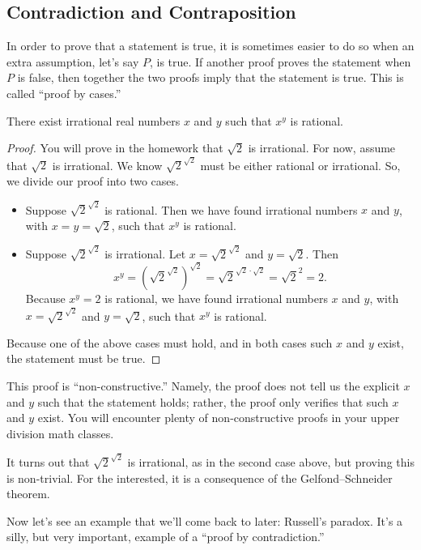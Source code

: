 \documentclass[../notes.tex]{subfiles}
\begin{document}
\subsection{Contradiction and Contraposition}
In order to prove that a statement is true, it is sometimes easier to do so when an extra assumption, let's say $P$, is true. If another proof proves the statement when $P$ is false, then together the two proofs imply that the statement is true. This is called ``proof by cases.''
\begin{example}
    There exist irrational real numbers $x$ and $y$ such that $x^y$ is rational.
\end{example}
\begin{proof}
    You will prove in the homework that $\sqrt{2}$ is irrational. For now, assume that $\sqrt{2}$ is irrational. We know $\sqrt{2}^{\sqrt{2}}$ must be either rational or irrational. So, we divide our proof into two cases.
    \begin{itemize}
        \item Suppose $\sqrt{2}^{\sqrt{2}}$ is rational. Then we have found irrational numbers $x$ and $y$, with $x = y = \sqrt{2}$, such that $x^y$ is rational.
        \item Suppose $\sqrt{2}^{\sqrt{2}}$ is irrational. Let $x = \sqrt{2}^{\sqrt{2}}$ and $y = \sqrt{2}$. Then
        \[x^y = \left(\sqrt{2}^{\sqrt{2}}\right)^{\sqrt{2}} = \sqrt{2}^{\sqrt{2} \cdot \sqrt{2}} = \sqrt{2}^2 = 2.\]
        Because $x^y=2$ is rational, we have found irrational numbers $x$ and $y$, with $x = \sqrt{2}^{\sqrt{2}}$ and $y = \sqrt{2}$, such that $x^y$ is rational. 
    \end{itemize}
    Because one of the above cases must hold, and in both cases such $x$ and $y$ exist, the statement must be true.
\end{proof}
This proof is ``non-constructive.'' Namely, the proof does not tell us the explicit $x$ and $y$ such that the statement holds; rather, the proof only verifies that such $x$ and $y$ exist. You will encounter plenty of non-constructive proofs in your upper division math classes.
\begin{remark}
    It turns out that $\sqrt{2}^{\sqrt{2}}$ is irrational, as in the second case above, but proving this is non-trivial. For the interested, it is a consequence of the Gelfond--Schneider theorem.
\end{remark}
Now let's see an example that we'll come back to later: Russell's paradox. It's a silly, but very important, example of a ``proof by contradiction.''
\end{document}
